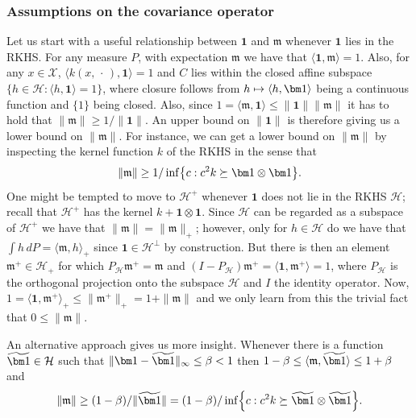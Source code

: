 \documentclass[10pt]{amsart}
\theoremstyle{definition}\newtheorem{defi}[theo]{Definition}\newtheorem{rema}[theo]{Remark}\newtheorem{exam}[theo]{Example}\newtheorem{exem}[theo]{Example}\newtheorem{nota}[theo]{Notation}
\theoremstyle{remark}
\newcommand{\X}{\mathcal{X}}
\newcommand{\cH}{\mathcal{H}}
\newcommand{\mean}{\mathfrak{m}}
\let\oldtilde\tilde
\renewcommand*{\tilde}[1]{\mathchoice{\widetilde{#1}}{\widetilde{#1}}{\oldtilde{#1}}{\oldtilde{#1}}}
\let\oldmapsto\mapsto
\renewcommand*{\mapsto}{\mathchoice{\longmapsto}{\oldmapsto}{\oldmapsto}{\oldmapsto}}
\let\originalleft\left
\let\originalright\right
\renewcommand{\left}{\mathopen{}\mathclose\bgroup\originalleft}
\renewcommand{\right}{\aftergroup\egroup\originalright}
\begin{document}
\subsubsection{Assumptions on the covariance operator} \label{sec:cov_centered}
Let us start with a useful relationship between $\bm 1$ and $\mean$ whenever $\bm 1$ lies in the RKHS. For any measure $P$, with expectation $\mean$ we have that $\langle \bm 1, \mean \rangle = 1$. Also, for any $x\in \X$, $\langle k(x,\,\cdot\,), \bm 1 \rangle = 1$ and $C$ lies within the closed affine subspace $\{h \in \cH : \langle h,\bm 1 \rangle =1 \}$, where closure follows from $h \mapsto \langle h, \bm 1\rangle$ being a continuous function and $\{1\}$ being closed. Also, since $1 = \langle \mean, \bm 1 \rangle \leq \|\bm 1\| \|\mean\|$ it has to hold that $\|\mean\| \geq 1/\|\bm 1\|$. An upper bound on $\| \bm 1 \|$ is therefore giving us a lower bound on $\| \mean\|$. For instance, we can get a lower bound on $\| \mean \|$ by inspecting the kernel function $k$ of the RKHS in the sense that
\begin{equation}
\|\mean\| \geq 1/ \inf\left\{ c: c^2 k \succeq \bm 1 \otimes \bm 1\right\}.
\end{equation}
One might be tempted to move to $\cH^+$ whenever $\bm 1$ does not lie in the RKHS $\cH$; recall that $\cH^+$ has the kernel $k + \bm 1 \otimes \bm 1$. Since $\cH$ can be regarded as a subspace of $\cH^+$ we have that $\|\mean\| = \|\mean\|_+$; however, only for $h\in \cH$ do we have that $\int h \, dP = \langle \mean, h \rangle_+$ since $\bm 1 \in \cH^\perp$ by construction. But there is then an element $\mean^+ \in \cH_+$ for which $P_\cH \mean^+ = \mean$ and $(I-P_\cH) \mean^+ = \langle \bm 1, \mean^+ \rangle = 1$, where $P_\cH$ is the orthogonal projection onto the subspace $\cH$ and $I$ the identity operator. Now, $1 = \langle \bm 1,\mean^+ \rangle_+ \leq \|\mean^+\|_+ = 1 + \|\mean\|$ and we only learn from this the trivial fact that $0 \leq \|\mean\|$.

An alternative approach gives us more insight. Whenever there is a function $\tilde{\bm 1} \in \cH$ such that $\|\bm 1 - \tilde{\bm 1}\|_\infty \leq \beta < 1$ then $ 1 - \beta \leq \langle \mean, \tilde{\bm 1} \rangle \leq 1+ \beta$ and
\begin{equation}
\| \mean \| \geq (1-\beta)/\|\tilde{\bm 1}\| = (1-\beta)/ \inf\left\{ c: c^2 k \succeq \tilde{\bm 1} \otimes \tilde{\bm 1}\right\}.
\end{equation}
\end{document}
